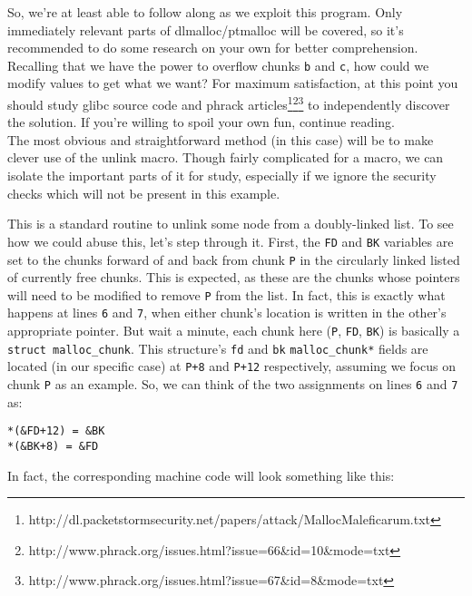 So, we're at least able to follow along as we exploit this program. Only
immediately relevant parts of dlmalloc/ptmalloc will be covered, so it's
recommended to do some research on your own for better comprehension. Recalling 
that we have the power to overflow chunks \texttt{b} and \texttt{c}, how
could we modify values to get what we want? For maximum satisfaction, at this 
point you should study glibc source code and phrack articles\footnote{http://dl.packetstormsecurity.net/papers/attack/MallocMaleficarum.txt}\footnote{http://www.phrack.org/issues.html?issue=66\&id=10\&mode=txt}\footnote{http://www.phrack.org/issues.html?issue=67\&id=8\&mode=txt} to independently
discover the solution. If you're willing to spoil your own fun, continue reading.\\

The most obvious and straightforward 
method (in this case) will be to make clever use of the unlink macro. Though
fairly complicated for a macro, we can isolate the important parts of it for study,
especially if we ignore the security checks which will not be present in this example.



This is a standard routine to unlink some node from a doubly-linked list.
To see how we could abuse this, let's step through it. First, the 
\texttt{FD} and \texttt{BK} variables are set to the chunks forward of and
back from chunk \texttt{P} in the circularly linked listed of currently
free chunks. This is expected, as these are the chunks whose pointers
will need to be modified to remove \texttt{P} from the list. In fact,
this is exactly what happens at lines \texttt{6} and \texttt{7}, when
either chunk's location is written in the other's appropriate pointer.
But wait a minute, each chunk here (\texttt{P}, \texttt{FD}, \texttt{BK})
is basically a \texttt{struct malloc\_chunk}. 
This structure's \texttt{fd} and \texttt{bk} \texttt{malloc\_chunk*}
fields are located (in our specific case) at \texttt{P+8} and 
\texttt{P+12} respectively, assuming we focus on chunk \texttt{P} as an example.
So, we can think of the two assignments on lines \texttt{6} and \texttt{7}
as:
\begin{lstlisting}
*(&FD+12) = &BK
*(&BK+8) = &FD
\end{lstlisting}
In fact, the corresponding machine code will look something like this:



